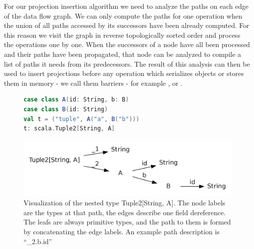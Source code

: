 For our projection insertion algorithm we need to analyze the paths on each edge of the data flow graph. We can only compute the paths for one operation when the union of all paths accessed by its successors have been already computed. For this reason we visit the graph in reverse topologically sorted order and process the operations one by one. When the successors of a node have all been processed and their paths have been propagated, that node can be analyzed to compile a list of paths it needs from its predecessors. The result of this analysis can then be used to insert projections before any operation which serializes objects or stores them in memory - we call them barriers - for example ,  or .

\begin{figure}
\begin{lstlisting}[language=Scala,name=code, caption=Nested type for paths example., captionpos=b, label=lst:types]
case class A(id: String, b: B)
case class B(id: String)  
val t = ("tuple", A("a", B("b"))) 
t: scala.Tuple2[String, A]
\end{lstlisting}
\centering
\includegraphics[clip=true, width=0.95\columnwidth]{dot/access.png}
\caption{Visualization of the nested type Tuple2[String, A]. The node labels are the types at that path, the edges describe one field dereference. The leafs are always primitive types, and the path to them is formed by concatenating the edge labels. An example path description is ``\_2.b.id''}
\label{fig:type_tree}
\end{figure}


